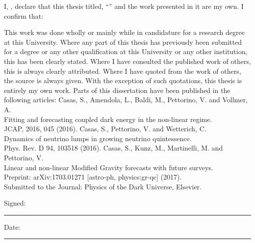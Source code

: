 \documentclass[
11pt, %
english, %
singlespacing, %
headsepline, %
]{MastersDoctoralThesis} %
\begin{document}
\begin{declaration}
\addchaptertocentry{\authorshipname}
\label{declaration-author}
\noindent I, \authorname, declare that this thesis titled, \enquote{\ttitle} and the work presented in it are my own. I confirm that:

\begin{outline} 
\1 This work was done wholly or mainly while in candidature for a research degree at this University.
\1 Where any part of this thesis has previously been submitted for a degree or any other qualification at this University or any other institution, this has been clearly stated.
\1 Where I have consulted the published work of others, this is always clearly attributed.
\1 Where I have quoted from the work of others, the source is always given. 
With the exception of such quotations, this thesis is entirely my own work. \done{}
\1 Parts of this dissertation have been published in the following articles:
\2 Casas, S., Amendola, L., Baldi, M., Pettorino, V. and Vollmer, A. \\
   Fitting and forecasting coupled dark energy in the non-linear regime. \\
   JCAP, 2016, 045 (2016).
\2 Casas, S., Pettorino, V. and Wetterich, C. \\ 
   Dynamics of neutrino lumps in growing neutrino quintessence. \\
   Phys. Rev. D 94, 103518 (2016).
\2 Casas, S., Kunz, M., Martinelli, M. and Pettorino, V. \\ 
   Linear and non-linear Modified Gravity forecasts with future surveys. \\ Preprint: arXiv:1703.01271 [astro-ph, physics:gr-qc] (2017). \\
   Submitted to the Journal: Physics of the Dark Universe, Elsevier.
\end{outline}
\vspace{1cm}
\noindent Signed:\\
\rule[0.5em]{25em}{0.5pt} %
 
\noindent Date:\\
\rule[0.5em]{25em}{0.5pt} %
\end{declaration}

\clearpage

\end{document}

